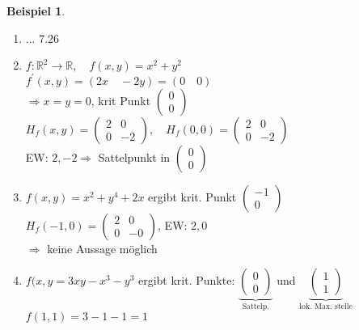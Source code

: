 \documentclass[a4paper,11pt]{article}
\newtheorem{bsp}[definition]{Beispiel}
\begin{document}
\begin{bsp}
\end{bsp}
\begin{enumerate}[label=\alph*)]
	\item ... 7.26
	\item $f\colon\mathbb{R}^2\to\mathbb{R},\quad f(x,y)=x^2+y^2$ \\
	$f^\prime(x,y)=(2x\quad -2y)=(0\quad0)$ \\
	$\Rightarrow x=y=0$, krit Punkt $\begin{pmatrix}0\\0\end{pmatrix}$ \\
	$H_f(x,y)=\begin{pmatrix}2&0\\0&-2\end{pmatrix},\quad H_f(0,0)=\begin{pmatrix}2&0\\0&-2\end{pmatrix}$ \\
	EW: $2,-2\Rightarrow$ Sattelpunkt in $\begin{pmatrix}0\\0\end{pmatrix}$
	\item $f(x,y)=x^2+y^4+2x$ ergibt krit. Punkt $\begin{pmatrix}-1\\0\end{pmatrix}$ \\
	$H_f(-1,0)=\begin{pmatrix}2&0\\0&-0\end{pmatrix}$, EW: $2,0$ \\
	$\Rightarrow$ keine Aussage möglich
	\item $f(x,y=3xy-x^3-y^3$ ergibt krit. Punkte: $\underbrace{\begin{pmatrix}0\\0\end{pmatrix}}_{\text{Sattelp.}}$ und $\underbrace{\begin{pmatrix}1\\1\end{pmatrix}}_{\text{lok. Max. stelle}}$ \\
	$f(1,1)=3-1-1=1$
\end{enumerate}
\end{document}
